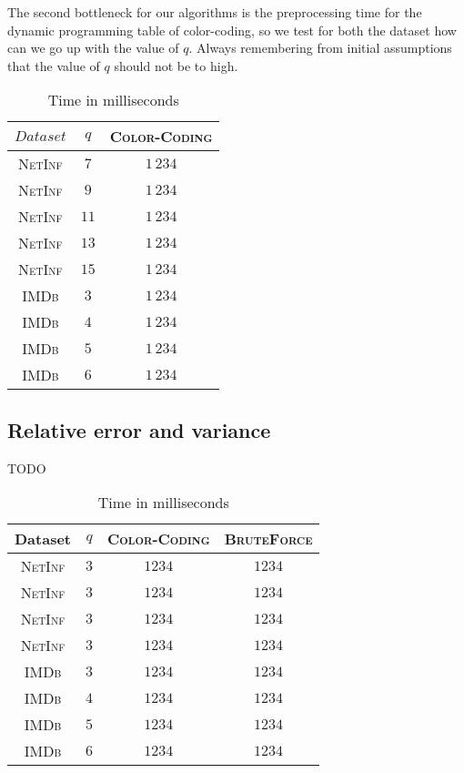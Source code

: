 	The second bottleneck for our algorithms is the preprocessing time for the dynamic programming table of color-coding, so we test for both the dataset how can we go up with the value of $q$. Always remembering from initial assumptions that the value of $q$ should not be to high. 

	\begin{table}[h]
		\centering
		\label{my-label}
		\begin{tabular}{|c|c|c|}
			\hline
			$Dataset$       & $q$  & \textsc{Color-Coding} \\ \hline
			\textsc{NetInf} & $7$  & $1\,234$ \\ \hline
			\textsc{NetInf} & $9$  & $1\,234$ \\ \hline
			\textsc{NetInf} & $11$ & $1\,234$ \\ \hline
			\textsc{NetInf} & $13$ & $1\,234$ \\ \hline
			\textsc{NetInf} & $15$ & $1\,234$ \\ \hline
			\textsc{IMDb}   & $3$  & $1\,234$ \\ \hline
			\textsc{IMDb}   & $4$  & $1\,234$ \\ \hline
			\textsc{IMDb}   & $5$  & $1\,234$ \\ \hline
			\textsc{IMDb}   & $6$  & $1\,234$ \\ \hline
		\end{tabular}
		\caption{Time in milliseconds}
	\end{table}

	\subsection*{Relative error and variance}
	
		
	TODO
	\begin{table}[h]
		\centering
		\label{my-label}
		\begin{tabular}{|c|c|c|c|}
			\hline
			Dataset 		& $q$ & \textsc{Color-Coding} 	& \textsc{BruteForce} \\ \hline
			\textsc{NetInf}	& $3$ & $1234$					& $1234$ \\ \hline
			\textsc{NetInf}	& $3$ & $1234$					& $1234$ \\ \hline
			\textsc{NetInf}	& $3$ & $1234$					& $1234$ \\ \hline
			\textsc{NetInf}	& $3$ & $1234$					& $1234$ \\ \hline
			\textsc{IMDb}	& $3$ & $1234$					& $1234$ \\ \hline
			\textsc{IMDb}	& $4$ & $1234$					& $1234$ \\ \hline
			\textsc{IMDb}	& $5$ & $1234$					& $1234$ \\ \hline
			\textsc{IMDb}	& $6$ & $1234$					& $1234$ \\ \hline
		\end{tabular}
		\caption{Time in milliseconds}
	\end{table}
		
